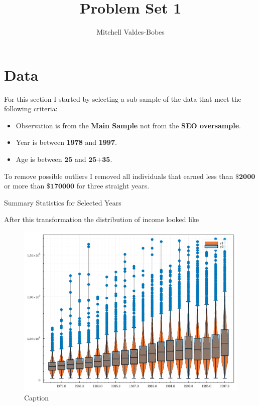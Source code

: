 \documentclass[12pt]{article}
\begin{document}
\title{Problem Set 1 }
\author{Mitchell Valdes-Bobes}
\maketitle



\section{Data}

For this section I started by selecting a sub-sample of the data that meet the following criteria:
\begin{itemize}
    \item Observation is from the \textbf{Main Sample} not from the \textbf{SEO oversample}.
    \item Year is between \textbf{1978} and \textbf{1997}.
    \item Age is between $\textbf{25}$ and $\textbf{25+35}$.
\end{itemize}

To remove possible outliers I removed all individuals that earned less than $\textbf{\$2000}$ or more than $\textbf{\$170000}$ for three straight years. 

\begin{center}
\begin{table}[h!]\caption{Summary Statistics for Selected Years}

\end{table}
\end{center}

After this transformation the distribution of income looked like 
\begin{figure}[h*]
    \centering
    \includegraphics[scale = .5]{04 - 2022 Fall/Econ 810 Advanded Macroeconomic Theory/Part 1/PS 1/document/figures/data_outliers.pdf}
    \caption{Caption}
    \label{fig:my_label}
\end{figure}
\end{document}
